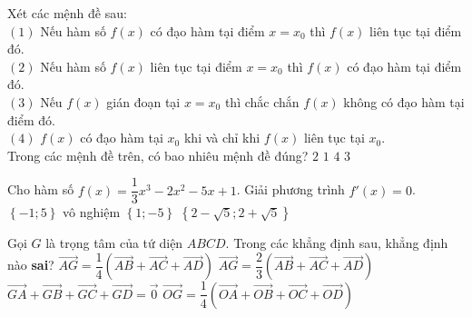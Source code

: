 \begin{ex}%
	Xét các mệnh đề sau: \\
	$(1)$ Nếu hàm số $f(x)$ có đạo hàm tại điểm $x=x_0$ thì $f(x)$ liên tục tại điểm đó. \\
	$(2)$ Nếu hàm số $f(x)$ liên tục tại điểm $x=x_0$ thì $f(x)$ có đạo hàm tại điểm đó. \\
	$(3)$ Nếu $f(x)$ gián đoạn tại $x=x_0$ thì chắc chắn $f(x)$ không có đạo hàm tại điểm đó. \\
	$(4)$ $f(x)$ có đạo hàm tại $x_0$ khi và chỉ khi $f(x)$ liên tục tại $x_0$. \\
	Trong các mệnh đề trên, có bao nhiêu mệnh đề đúng?
	\choice
	{\True $2$}
	{$1$}
	{$4$}
	{$3$}
\end{ex}
\begin{ex}%
	Cho hàm số $f(x)=\dfrac{1}{3}x^3-2x^2-5x+1$. Giải phương trình $f'(x)=0$.
	\choice
	{\True $\left\{-1;5\right\}$}
	{vô nghiệm}
	{$\left\{1;-5\right\}$}
	{$\left\{2-\sqrt{5};2+\sqrt{5}\right\}$}
	\loigiai{
		Ta có: $f'(x)=x^2-4x-5$. \\
		Do đó $f'(x)=0 \Leftrightarrow x^2-4x-5=0 \Leftrightarrow \left[\begin{aligned}
		&x=-1 \\
		&x=5
		\end{aligned}\right. $.}
\end{ex}
\begin{ex}%
	Gọi $G$ là trọng tâm của tứ diện $ABCD$. Trong các khẳng định sau, khẳng định nào \textbf{sai}?
	\choice
	{$\overrightarrow{AG}=\dfrac{1}{4}\left(\overrightarrow{AB}+\overrightarrow{AC}+\overrightarrow{AD}\right)$}
	{\True $\overrightarrow{AG}=\dfrac{2}{3}\left(\overrightarrow{AB}+\overrightarrow{AC}+\overrightarrow{AD}\right)$}
	{$\overrightarrow{GA}+\overrightarrow{GB}+\overrightarrow{GC}+\overrightarrow{GD}=\overrightarrow{0}$}
	{$\overrightarrow{OG}=\dfrac{1}{4}\left(\overrightarrow{OA}+\overrightarrow{OB}+\overrightarrow{OC}+\overrightarrow{OD}\right)$}
\end{ex}
